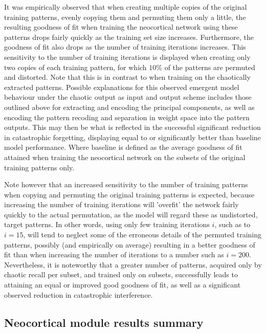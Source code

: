 It was empirically observed that when creating multiple copies of the original training patterns, evenly copying them and permuting them only a little, the resulting goodness of fit when training the neocortical network using these patterns drops fairly quickly as the training set size increases. Furthermore, the goodness of fit also drops as the number of training iterations increases. This sensitivity to the number of training iterations is displayed when creating only two copies of each training pattern, for which $10 \%$ of the patterns are permuted and distorted. Note that this is in contrast to when training on the chaotically extracted patterns. Possible explanations for this observed emergent model behaviour under the chaotic output as input and output scheme includes those outlined above for extracting and encoding the principal components, as well as encoding the pattern recoding and separation in weight space into the pattern outputs. This may then be what is reflected in the successful significant reduction in catastrophic forgetting, displaying equal to or significantly better than baseline model performance. Where baseline is defined as the average goodness of fit attained when training the neocortical network on the subsets of the original training patterns only. 

Note however that an increased sensitivity to the number of training patterns when copying and permuting the original training patterns is expected, because increasing the number of training iterations will 'overfit' the network fairly quickly to the actual permutation, as the model will regard these as undistorted, target patterns. 
In other words, using only few training iterations $i$, such as to $i=15$, will tend to neglect some of the erroneous details of the permuted training patterns, possibly (and empirically on average) resulting in a better goodness of fit than when increasing the number of iterations to a number such as $i=200$. 
Nevertheless, it is noteworthy that a greater number of patterns, acquired only by chaotic recall per subset, and trained only on subsets, successfully leads to attaining an equal or improved good goodness of fit, as well as a significant observed reduction in catastrophic interference.


\subsection{Neocortical module results summary}


